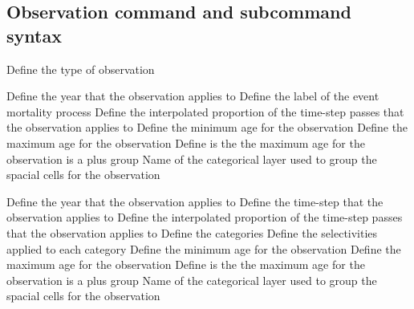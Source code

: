\subsection{Observation command and subcommand syntax}\par
{}\par\par
{} {Define the type of observation}
\par\textbf{}\par
{} {Define the year that the observation applies to}
 {Define the label of the event mortality process}
 {Define the interpolated proportion of the time-step passes that the observation applies to}
 {Define the minimum age for the observation}
 {Define the maximum age for the observation}
 {Define is the the maximum age for the observation is a plus group}
 {Name of the categorical layer used to group the spacial cells for the observation}
\par\textbf{}\par
{} {Define the year that the observation applies to}
 {Define the time-step that the observation applies to}
 {Define the interpolated proportion of the time-step passes that the observation applies to}
 {Define the categories}
 {Define the selectivities applied to each category}
 {Define the minimum age for the observation}
 {Define the maximum age for the observation}
 {Define is the the maximum age for the observation is a plus group}
 {Name of the categorical layer used to group the spacial cells for the observation}
